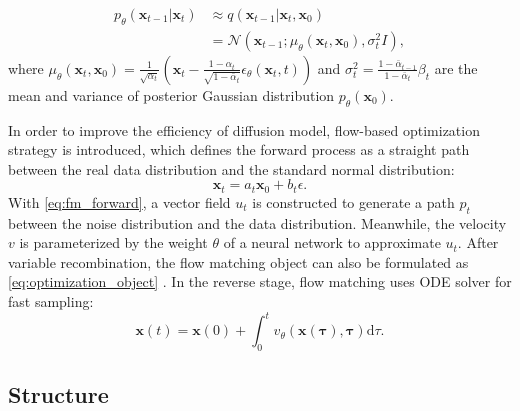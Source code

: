 \begin{equation}
\begin{split}
    p_{\theta}\left(\mathbf{x}_{t-1}|\mathbf{x}_{t}\right)&\approx q\left(\mathbf{x}_{t-1}|\mathbf{x}_{t},\mathbf{x}_{0}\right) \\
    &=\mathcal{N}\left(\mathbf{x}_{t-1};\mu_{\theta}\left(\mathbf{x}_{t},\mathbf{x}_{0}\right),\sigma_{t}^{2}\boldsymbol{\mathit{I}}\right),
\end{split}
\end{equation}
where $\mu_{\theta}\left(\mathbf{x}_{t},\mathbf{x}_{0}\right)=\frac{1}{\sqrt{\alpha_t}}\left(\mathbf{x}_{t}-\frac{1-\alpha_{t}}{\sqrt{1-\bar{\alpha}_{t}}}\epsilon_{\theta}\left(\mathbf{x}_{t},t\right)\right)$ and $\sigma_{t}^{2}=\frac{1-\bar{\alpha}_{t-1}}{1-\bar{\alpha}_{t}}\beta_{t}$ are the mean and variance of posterior Gaussian distribution $p_{\theta}\left(\mathbf{x}_{0}\right)$.

In order to improve the efficiency of diffusion model, flow-based optimization strategy \cite{lipman2022flow,liu2022flow,liu2023instaflow} is introduced, which defines the forward process as a straight path between the real data distribution and the standard normal distribution:
\begin{equation}
    \mathbf{x} _t=a_t\mathbf{x} _0+b_t\epsilon. 
\label{eq:fm_forward}
\end{equation}
With \cref{eq:fm_forward}, a vector field $u_t$ is constructed to generate a path $p_t$ between the noise distribution and the data distribution. Meanwhile, the velocity $v$ is parameterized by the weight $\theta$ of a neural network to approximate $u_t$. After variable recombination, the flow matching object can also be formulated as \cref{eq:optimization_object} \cite{SD3}. In the reverse stage, flow matching uses ODE solver for fast sampling:
\begin{equation}
    \mathbf{x}\left(t\right)=\mathbf{x}\left(0\right)+\int_{0}^{t}v_{\theta}\left(\mathbf{x\left(\tau\right),\tau}\right)\mathrm{d}\tau.   
\end{equation}

\subsection{Structure}
\label{sec:structure}

